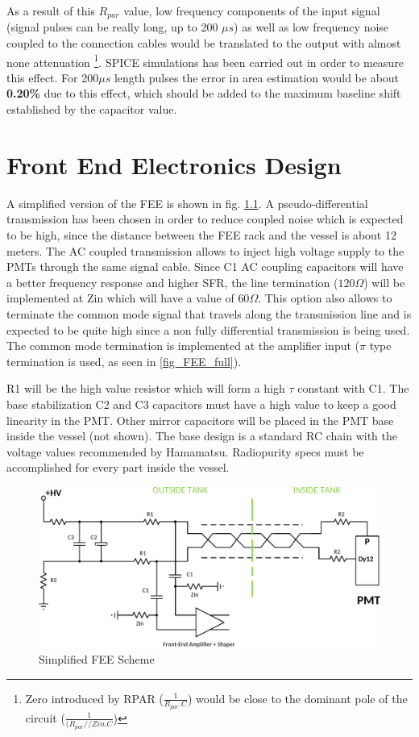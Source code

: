 \documentclass[a4paper,11pt]{report}
\begin{document}
  As a result of this $R_{par}$ value, low frequency components of the input signal (signal pulses can be really long, up to 200 $\mu s$) as well as low frequency noise coupled to the connection cables would be translated to the output with almost none attenuation \footnote{Zero introduced by RPAR ($\frac{1}{R_{par}.C}$) would be close to the dominant pole of the circuit ($\frac{1}{(R_{par}//Zin.C}$) }. SPICE simulations has been carried out in order to measure this effect. For 200$\mu s$ length pulses the error in area estimation would be about \textbf{0.20\%} due to this effect, which should be added to the maximum baseline shift established by the capacitor value.


\chapter{Front End Electronics Design}

  A simplified version of the FEE is shown in fig. \ref{fig:FEE_scheme}. A pseudo-differential transmission has been chosen in order to reduce coupled noise which is expected to be high, since the distance between the FEE rack and the vessel is about 12 meters. The AC coupled transmission allows to inject high voltage supply to the PMTs through the same signal cable. Since C1 AC coupling capacitors will have a better frequency response and higher SFR, the line termination ($120\Omega$) will be implemented at Zin which will have a value of $60\Omega$. This option also allows to terminate the common mode signal that travels along the transmission line and is expected to be quite high since a non fully differential transmission is being used. The common mode termination is implemented at the amplifier input ($\pi$ type termination is used, as seen in \ref{fig_FEE_full}).
  
  R1 will be the high value resistor which will form a high $\tau$ constant with C1. The base stabilization C2 and C3 capacitors must have a high value to keep a good linearity in the PMT. Other mirror capacitors will be placed in the PMT base inside the vessel (not shown). The base design is a standard RC chain with the voltage values recommended by Hamamatsu. Radiopurity specs must be accomplished for every part inside the vessel.


\begin{figure}
  \begin{center}
    \includegraphics[width=\textwidth]{./figures/FEE_simple_scheme.pdf}
    \caption{Simplified FEE Scheme}
    \label{fig:FEE_scheme}
  \end{center}
\end{figure}
\end{document}
